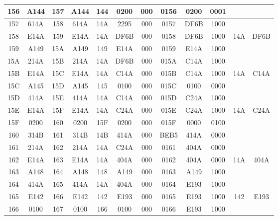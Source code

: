 \begin{table}[ht]
{\begin{tabular}{| c | c | c | c | c | c | c | c | c | c | c | c |}
        156 & A144 & 157 & A144 & 144 & 0200 & 000 & 0156 & 0200 & 0001 & ~ & ~ \\ \hline
        157 & 614A & 158 & 614A & 14A & 2295 & 000 & 0157 & DF6B & 1000 & ~ & ~ \\ \hline
        158 & E14A & 159 & E14A & 14A & DF6B & 000 & 0158 & DF6B & 1000 & 14A & DF6B \\ \hline
        159 & A149 & 15A & A149 & 149 & E14A & 000 & 0159 & E14A & 1000 & ~ & ~ \\ \hline
        15A & 214A & 15B & 214A & 14A & DF6B & 000 & 015A & C14A & 1000 & ~ & ~ \\ \hline
        15B & E14A & 15C & E14A & 14A & C14A & 000 & 015B & C14A & 1000 & 14A & C14A \\ \hline
        15C & A145 & 15D & A145 & 145 & 0100 & 000 & 015C & 0100 & 0000 & ~ & ~ \\ \hline
        15D & 414A & 15E & 414A & 14A & C14A & 000 & 015D & C24A & 1000 & ~ & ~ \\ \hline
        15E & E14A & 15F & E14A & 14A & C24A & 000 & 015E & C24A & 1000 & 14A & C24A \\ \hline
        15F & 0200 & 160 & 0200 & 15F & 0200 & 000 & 015F & 0000 & 0100 & ~ & ~ \\ \hline
        160 & 314B & 161 & 314B & 14B & 414A & 000 & BEB5 & 414A & 0000 & ~ & ~ \\ \hline
        161 & 214A & 162 & 214A & 14A & C24A & 000 & 0161 & 404A & 0000 & ~ & ~ \\ \hline
        162 & E14A & 163 & E14A & 14A & 404A & 000 & 0162 & 404A & 0000 & 14A & 404A \\ \hline
        163 & A148 & 164 & A148 & 148 & A149 & 000 & 0163 & A149 & 1000 & ~ & ~ \\ \hline
        164 & 414A & 165 & 414A & 14A & 404A & 000 & 0164 & E193 & 1000 & ~ & ~ \\ \hline
        165 & E142 & 166 & E142 & 142 & E193 & 000 & 0165 & E193 & 1000 & 142 & E193 \\ \hline
        166 & 0100 & 167 & 0100 & 166 & 0100 & 000 & 0166 & E193 & 1000 & ~ & ~ \\ \hline

    \end{tabular}}
\end{table}
